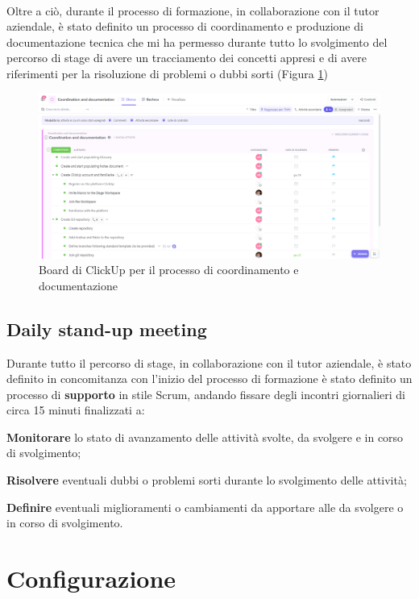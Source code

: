 \\
Oltre a ciò, durante il processo di formazione, in collaborazione con il tutor aziendale, è stato definito un processo di coordinamento e produzione di 
documentazione tecnica che mi ha permesso durante tutto lo svolgimento del percorso di stage di avere un tracciamento dei concetti appresi 
e di avere riferimenti per la risoluzione di problemi o dubbi sorti (Figura \ref{cap:Documentazione})
\begin{figure}[h]
    \centering
    \includegraphics[width=1\textwidth]{images/percorso/coordinamento.png}
    \caption{Board di ClickUp per il processo di coordinamento e documentazione}
    \label{cap:Documentazione}
\end{figure}
\subsection{Daily stand-up meeting}
Durante tutto il percorso di stage, in collaborazione con il tutor aziendale, è stato definito in concomitanza con l'inizio del processo di formazione
è stato definito un processo di \textbf{supporto} in stile \gls{Scrum}{}, andando fissare degli incontri giornalieri di circa 15 minuti finalizzati a:
\begin{list}{*}
    \item \textbf{Monitorare} lo stato di avanzamento delle attività svolte, da svolgere e in corso di svolgimento;
    \item \textbf{Risolvere} eventuali dubbi o problemi sorti durante lo svolgimento delle attività;
    \item \textbf{Definire} eventuali miglioramenti o cambiamenti da apportare alle da svolgere o in corso di svolgimento.
\end{list}
\section{Configurazione}
